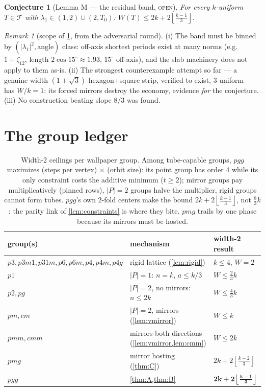 \documentclass[11pt,a4paper,oneside]{article}
\theoremstyle{plain}
\newtheorem{conjecture}[theorem]{Conjecture}
\theoremstyle{definition}
\theoremstyle{remark}
\newtheorem{remark}[theorem]{Remark}
\newcommand{\Tcl}{\mathcal{T}}
\newcommand{\zt}[1]{\zeta_{#1}}
\newcommand{\fl}[1]{\left\lfloor #1 \right\rfloor}
\newcommand{\ceilw}{2k + 2\fl{\tfrac{k-1}{3}}}
\newcommand{\pmgw}{2k + 2\fl{\tfrac{k-2}{3}}}
\newcommand{\statOPEN}{\textcolor{red!60!black}{\textsc{open}}}
\begin{document}
\begin{conjecture}[Lemma M --- the residual band, \statOPEN]\label{conj:M}
For every $k$-uniform $T \in \Tcl$ with $\lambda_1 \in (1,2) \cup (2, T_0)$:
$W(T) \le \ceilw$.
\end{conjecture}

\begin{remark}[scope of \cref{conj:M}, from the adversarial round]
(i) The band must be binned by $(|\lambda_1|^2, \text{angle})$ class: off-axis shortest
periods exist at many norms (e.g.\ $1 + \zt{12}$, length $2\cos 15^\circ \approx 1.93$,
$15^\circ$ off-axis), and the slab machinery does not apply to them as-is. (ii) The
strongest counterexample attempt so far --- a genuine width-$(1{+}\sqrt3)$ hexagon+square
strip, verified to exist, $3$-uniform --- has $W/k = 1$: its forced mirrors destroy the
economy, evidence \emph{for} the conjecture. (iii) No construction beating slope $8/3$ was
found.
\end{remark}

\section{The group ledger}\label{sec:ledger}

\begin{table}[h]\centering
\begin{tabular}{@{}lll@{}}
\toprule
group(s) & mechanism & width-2 result \\
\midrule
$p3, p3m1, p31m, p6, p6m, p4, p4m, p4g$ & rigid lattice (\cref{lem:rigid}) & $k \le 4$, $W = 2$ \\
$p1$ & $|P| = 1$: $n = k$, $a \le k/3$ & $W \le \tfrac23 k$ \\
$p2, pg$ & $|P| = 2$, no mirrors: $n \le 2k$ & $W \le \tfrac43 k$ \\
$pm, cm$ & $|P| = 2$, mirrors (\cref{lem:vmirror}) & $W \le k$ \\
$pmm, cmm$ & mirrors both directions (\cref{lem:vmirror,lem:cmm}) & $W \le 2k$ \\
$pmg$ & mirror hosting (\cref{thm:C}) & $\pmgw$ \\
$pgg$ & \cref{thm:A,thm:B} & $\boldsymbol{\ceilw}$ \\
\bottomrule
\end{tabular}
\caption{Width-2 ceilings per wallpaper group. Among tube-capable groups, $pgg$ maximizes
(steps per vertex) $\times$ (orbit size): its point group has order $4$ while its only
constraint costs the additive minimum ($t \ge 2$); mirror groups pay multiplicatively
(pinned rows), $|P| = 2$ groups halve the multiplier, rigid groups cannot form tubes.
$pgg$'s own 2-fold centers make the bound $\ceilw$, not $\tfrac83 k$: the parity
link of \cref{lem:constraints} is where they bite. $pmg$ trails by one phase because its
mirrors must be hosted.}
\end{table}
\end{document}
